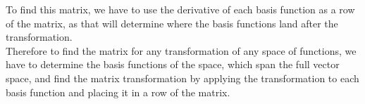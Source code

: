 \documentclass{article}
\begin{document}
To find this matrix, we have to use the derivative of each basis function as a row of the matrix, as that will determine where the basis functions land after the transformation.\\
Therefore to find the matrix for any transformation of any space of functions, we have to determine the basis functions of the space, which span the full vector space, and find the matrix transformation by applying the transformation to each basis function and placing it in a row of the matrix.
\end{document}
